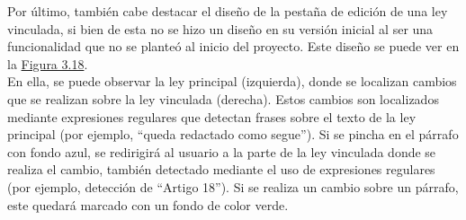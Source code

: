 Por último, también cabe destacar el diseño de la pestaña de edición de una ley vinculada, si bien de esta no se hizo un diseño en su versión inicial al ser una funcionalidad que no se planteó al inicio del proyecto. Este diseño se puede ver en la \hyperref[enlacePLeyVinculadaDiseno]{Figura 3.18}.
\\

En ella, se puede observar la ley principal (izquierda), donde se localizan cambios que se realizan sobre la ley vinculada (derecha). Estos cambios son localizados mediante expresiones regulares que detectan frases sobre el texto de la ley principal (por ejemplo, ``queda redactado como segue''). Si se pincha en el párrafo con fondo azul, se redirigirá al usuario a la parte de la ley vinculada donde se realiza el cambio, también detectado mediante el uso de expresiones regulares (por ejemplo, detección de ``Artigo 18''). Si se realiza un cambio sobre un párrafo, este quedará marcado con un fondo de color verde.